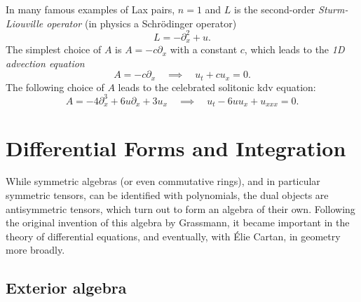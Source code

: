 \begin{example}
    In many famous examples of Lax pairs, $n=1$ and $L$ is the second-order \emph{Sturm-Liouville operator} (in physics a Schr\"odinger operator)
    \[L=-\partial_x^2+u.\]
    The simplest choice of $A$ is $A=-c\partial_x$ with a constant $c$, which leads to the \emph{1D advection equation}
    \[A=-c\partial_x\quad \implies \quad u_t+c u_x=0.\]
    The following choice of $A$ leads to the celebrated solitonic \gls{kdv} equation:
    \[A=-4\partial_x^3+6u\partial_x+3u_x\quad \implies\quad u_t-6uu_x+u_{xxx}=0.\label{eq kdv}\]
\end{example}










\clearpage
\chapter{Differential Forms and Integration}\label{ch: differential forms}


While symmetric algebras (or even commutative rings), and in particular symmetric tensors, can be identified with polynomials, the dual objects are antisymmetric tensors, which turn out to form an algebra of their own. Following the original invention of this algebra by Grassmann, it became important in the theory of differential equations, and eventually, with \'Elie Cartan, in geometry more broadly.


\section{Exterior algebra}


